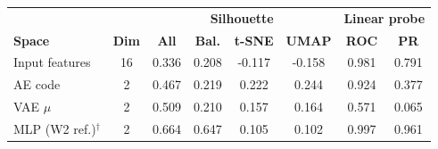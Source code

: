 \begin{tabular}{lccccccc}
\hline
& & \multicolumn{4}{c}{\textbf{Silhouette}} & \multicolumn{2}{c}{\textbf{Linear probe}} \\
\textbf{Space} & \textbf{Dim} & \textbf{All} & \textbf{Bal.} & \textbf{t-SNE} & \textbf{UMAP} & \textbf{ROC} & \textbf{PR} \\ \hline
Input features & 16 & 0.336 & 0.208 & -0.117 & -0.158 & 0.981 & 0.791 \\
AE code & 2 & 0.467 & 0.219 & 0.222 & 0.244 & 0.924 & 0.377 \\
VAE $\mu$ & 2 & 0.509 & 0.210 & 0.157 & 0.164 & 0.571 & 0.065 \\
MLP (W2 ref.)$^\dagger$ & 2 & 0.664 & 0.647 & 0.105 & 0.102 & 0.997 & 0.961 \\
\hline
\end{tabular}

